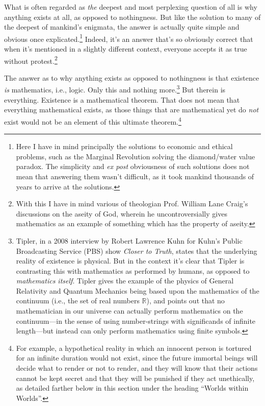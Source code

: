 \documentclass[letterpaper,12pt]{article}
\begin{document}
What is often regarded as \emph{the} deepest and most perplexing question of all is why anything exists at all, as opposed to nothingness. But like the solution to many of the deepest of mankind's enigmata, the answer is actually quite simple and obvious once explicated.\footnote{Here I have in mind principally the solutions to economic and ethical problems, such as the Marginal Revolution solving the diamond/water value paradox. The simplicity and \emph{ex post} obviousness of such solutions does not mean that answering them wasn't difficult, as it took mankind thousands of years to arrive at the solutions.} Indeed, it's an answer that's so obviously correct that when it's mentioned in a slightly different context, everyone accepts it as true without protest.\footnote{With this I have in mind various of theologian Prof. William Lane Craig's discussions on the aseity of God, wherein he uncontroversially gives mathematics as an example of something which has the property of aseity.}

The answer as to why anything exists as opposed to nothingness is that existence \emph{is} mathematics, i.e., logic. Only this and nothing more.\footnote{Tipler, in a 2008 interview by Robert Lawrence Kuhn for Kuhn's Public Broadcasting Service (PBS) show \emph{Closer to Truth}, states that the underlying reality of existence is physical. But in the context it's clear that Tipler is contrasting this with mathematics as performed by humans, as opposed to \emph{mathematics itself}. Tipler gives the example of the physics of General Relativity and Quantum Mechanics being based upon the mathematics of the continuum (i.e., the set of real numbers \( \mathbb{R} \)), and points out that no mathematician in our universe can actually perform mathematics on the continuum---in the sense of using number-strings with significands of infinite length---but instead can only perform mathematics using finite symbols.} But therein is everything. Existence is a mathematical theorem. That does not mean that everything mathematical exists, as those things that are mathematical yet do \emph{not} exist would not be an element of this ultimate theorem.\footnote{For example, a hypothetical reality in which an innocent person is tortured for an infinite duration would not exist, since the future immortal beings will decide what to render or not to render, and they will know that their actions cannot be kept secret and that they will be punished if they act unethically, as detailed farther below in this section under the heading ``Worlds within Worlds''.}
\end{document}
